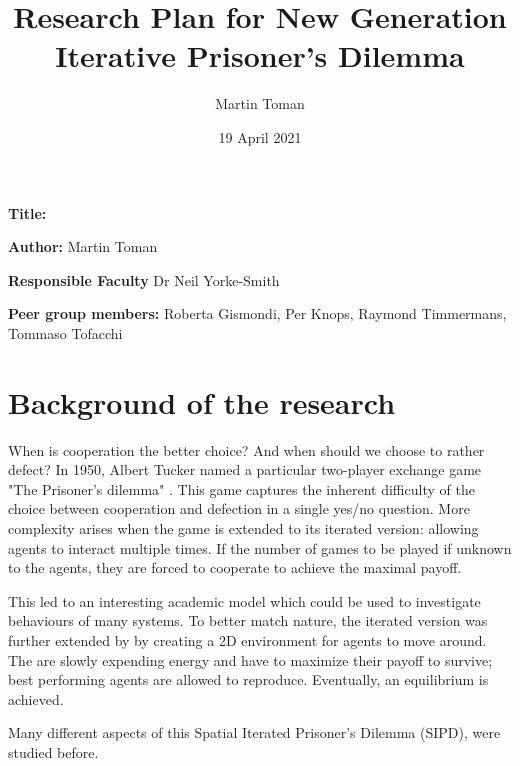 \documentclass[english]{article}
\title{Research Plan for New Generation Iterative Prisoner's Dilemma}
\author{Martin Toman}
\date{19 April 2021}
\newcommand{\namelistlabel}[1]{\mbox{#1}\hfil}
\newenvironment{namelist}[1]{%
\begin{list}{}{
  \let\makelabel\namelistlabel
  \settowidth{\labelwidth}{#1}
  \setlength{\leftmargin}{1.1\labelwidth}
}}{%
\end{list}}
\begin{document}
\listoftodos

\maketitle
\begin{namelist}{}
\item[{\bf Title:}]
\item[{\bf Author:}]
  Martin Toman
\item[{\bf Responsible Faculty}]
  Dr Neil Yorke-Smith
\item[{\bf Peer group members:}]
  Roberta Gismondi,
  Per Knops,
  Raymond Timmermans,
  Tommaso Tofacchi
\end{namelist}



\section*{Background of the research}
When is cooperation the better choice? And when should we choose to rather defect?
In 1950, Albert Tucker named a particular two-player exchange game "The Prisoner’s dilemma" \citep{sep-prisoner-dilemma}.
This game captures the inherent difficulty of the choice between cooperation and defection in a single yes/no question.
More complexity arises when the game is extended to its iterated version: allowing agents to interact multiple times. If the number of games to be played if unknown to the agents, they are forced to cooperate to achieve the maximal payoff.

This led to an interesting academic model which could be used to investigate behaviours of many systems.
To better match nature, the iterated version was further extended by \citet{smaldino} by creating a 2D environment for agents to move around. The are slowly expending energy and have to maximize their payoff to survive; best performing agents are allowed to reproduce. Eventually, an equilibrium is achieved.

Many different aspects of this Spatial Iterated Prisoner’s Dilemma (SIPD), were studied before. 

\end{document}
